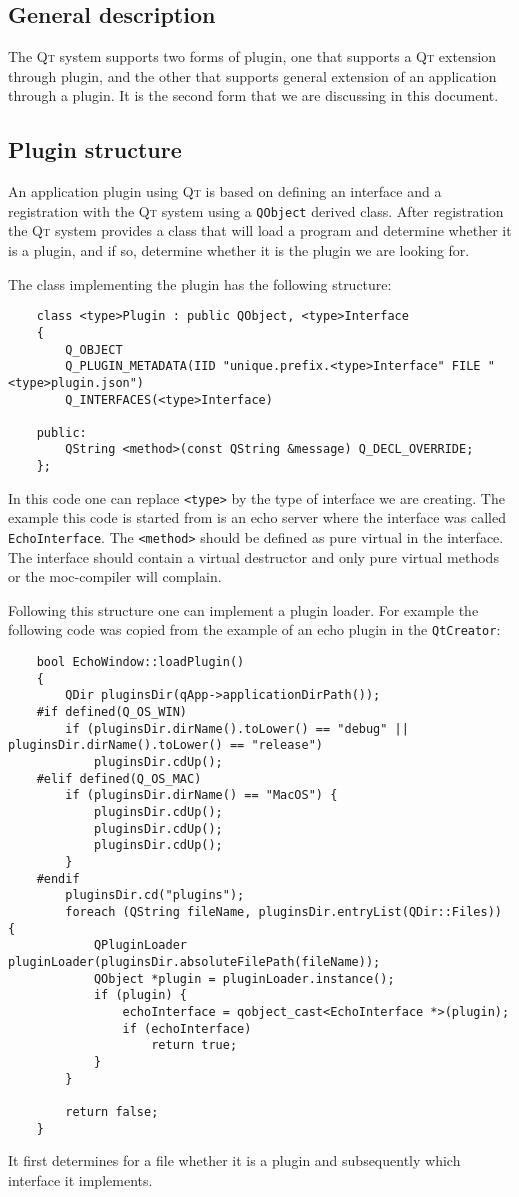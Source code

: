 \documentclass[a4paper,11pt,final]{article}
\newcommand{\qt}{\textsc{Qt}\xspace}%
\newcommand{\code}[1]{\texttt{#1}\xspace}%
\begin{document}
\subsection{General description}

The \qt system supports two forms of plugin, one that supports a \qt extension through plugin, and
the other that supports general extension of an application through a plugin. It is the second form
that we are discussing in this document. 

\subsection{Plugin structure}

An application plugin using \qt is based on defining an interface and a registration with the \qt
system using a \code{QObject} derived class. After registration the \qt system provides a class
\code{} that will load a program and determine whether it is a plugin, and if so, determine
whether it is the plugin we are looking for.

The class implementing the plugin has the following structure:

\begin{verbatim}
	class <type>Plugin : public QObject, <type>Interface
	{
	    Q_OBJECT
	    Q_PLUGIN_METADATA(IID "unique.prefix.<type>Interface" FILE "<type>plugin.json")
	    Q_INTERFACES(<type>Interface)
	
	public:
	    QString <method>(const QString &message) Q_DECL_OVERRIDE;
	};
\end{verbatim}

In this code one can replace \verb=<type>= by the type of interface we are creating. The 
example this code is started from is an echo server where the interface was called 
\code{EchoInterface}. The \verb=<method>= should be defined as pure virtual in the interface.
The interface should contain a virtual destructor and only pure virtual methods or the
moc-compiler will complain.

Following this structure one can implement a plugin loader. For example the following code was 
copied from the example of an echo plugin in the \code{QtCreator}:

\begin{verbatim}
	bool EchoWindow::loadPlugin()
	{
	    QDir pluginsDir(qApp->applicationDirPath());
	#if defined(Q_OS_WIN)
	    if (pluginsDir.dirName().toLower() == "debug" || pluginsDir.dirName().toLower() == "release")
	        pluginsDir.cdUp();
	#elif defined(Q_OS_MAC)
	    if (pluginsDir.dirName() == "MacOS") {
	        pluginsDir.cdUp();
	        pluginsDir.cdUp();
	        pluginsDir.cdUp();
	    }
	#endif
	    pluginsDir.cd("plugins");
	    foreach (QString fileName, pluginsDir.entryList(QDir::Files)) {
	        QPluginLoader pluginLoader(pluginsDir.absoluteFilePath(fileName));
	        QObject *plugin = pluginLoader.instance();
	        if (plugin) {
	            echoInterface = qobject_cast<EchoInterface *>(plugin);
	            if (echoInterface)
	                return true;
	        }
	    }
	
	    return false;
	}
\end{verbatim}

It first determines for a file whether it is a plugin and subsequently which interface
it implements.
\end{document}
